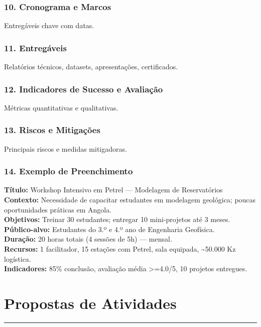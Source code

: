 \documentclass[12pt,a4paper]{article}
\begin{document}
\subsubsection*{10. Cronograma e Marcos}
Entregáveis chave com datas.

\subsubsection*{11. Entregáveis}
Relatórios técnicos, datasets, apresentações, certificados.

\subsubsection*{12. Indicadores de Sucesso e Avaliação}
Métricas quantitativas e qualitativas.

\subsubsection*{13. Riscos e Mitigações}
Principais riscos e medidas mitigadoras.

\subsubsection*{14. Exemplo de Preenchimento}

\begin{goldbox}
\small
\textbf{Título:} Workshop Intensivo em Petrel — Modelagem de Reservatórios\\
\textbf{Contexto:} Necessidade de capacitar estudantes em modelagem geológica; poucas oportunidades práticas em Angola.\\
\textbf{Objetivos:} Treinar 30 estudantes; entregar 10 mini-projetos até 3 meses.\\
\textbf{Público-alvo:} Estudantes do 3.º e 4.º ano de Engenharia Geofísica.\\
\textbf{Duração:} 20 horas totais (4 sessões de 5h) — mensal.\\
\textbf{Recursos:} 1 facilitador, 15 estações com Petrel, sala equipada, \textasciitilde50.000 Kz logística.\\
\textbf{Indicadores:} 85\% conclusão, avaliação média >=4.0/5, 10 projetos entregues.
\end{goldbox}

\clearpage

\section{Propostas de Atividades}
\begin{center}{\color{gold}\rule{8cm}{0.6pt}}\end{center}
\end{document}
